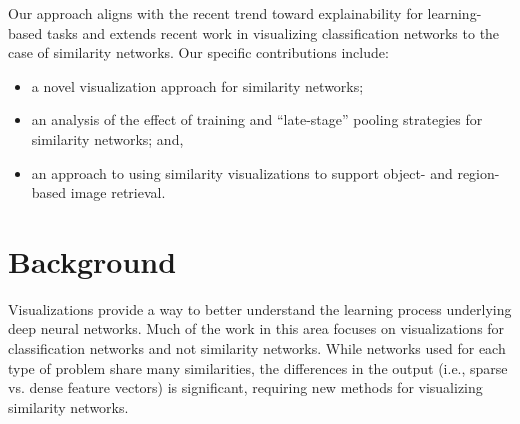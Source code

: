 Our approach aligns with the recent trend toward explainability for learning-based tasks and extends recent work in visualizing classification networks to the case of similarity networks. Our specific contributions include:
\begin{itemize}
\itemsep0em 
    \item a novel visualization approach for similarity networks;
    \item an analysis of the effect of training and ``late-stage'' pooling strategies for similarity networks; and,
    \item an approach to using similarity visualizations to support object- and region-based image retrieval.
\end{itemize}





\section{Background}
Visualizations provide a way to better understand the learning process underlying deep neural networks. Much of the work in this area focuses on visualizations for classification networks and not similarity networks. While networks used for each type of problem share many similarities, the differences in the output (i.e., sparse vs. dense feature vectors) is significant, requiring new methods for visualizing similarity networks.

